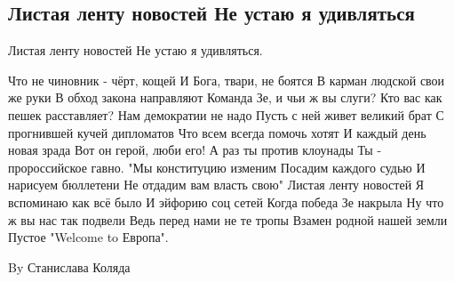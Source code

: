  
 
 

\subsection{Листая ленту новостей Не устаю я удивляться}
\label{sec:13_11_2020.tg.olesja_medvedeva.1.stih_koljada}


\obeycr
Листая ленту новостей 
Не устаю я удивляться.

Что не чиновник - чёрт, кощей
И Бога, твари, не боятся
В карман людской свои же руки
В обход закона направляют
Команда Зе, и чьи ж вы слуги? 
Кто вас как пешек расставляет? 
Нам демократии не надо
Пусть с ней живет великий брат
С прогнившей кучей дипломатов
Что всем всегда помочь хотят
И каждый день новая зрада
Вот он герой, люби его! 
А раз ты против клоунады
Ты - пророссийское гавно. 
"Мы конституцию изменим
Посадим каждого судью
И нарисуем бюллетени
Не отдадим вам власть свою"
Листая ленту новостей
Я вспоминаю как всё было 
И эйфорию соц сетей
Когда победа Зе накрыла
Ну что ж вы нас так подвели
Ведь перед нами не те тропы
Взамен родной нашей земли
Пустое "Welcome to Европа".

By Станислава Коляда
\restorecr
